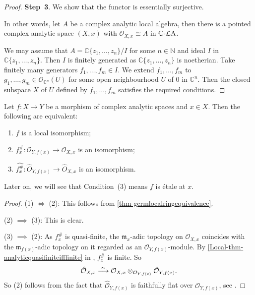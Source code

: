 \begin{proof}
    \textbf{Step~3}. We show that the functor is essentially surjective.

    In other words, let $A$ be a complex analytic local algebra, then there is a pointed complex analytic space $(X,x)$ with $\mathcal{O}_{X,x}\cong A$ in $\mathbb{C}\text{-}\mathcal{L}\mathrm{A}$.

    We may assume that $A=\mathbb{C}\{z_1,\ldots,z_n\}/I$ for some $n\in \mathbb{N}$ and ideal $I$ in $\mathbb{C}\{z_1,\ldots,z_n\}$. Then $I$ is finitely generated as $\mathbb{C}\{z_1,\ldots,z_n\}$ is noetherian. Take finitely many generators $f_1,\ldots,f_m\in I$. We extend $f_1,\ldots,f_m$ to $g_1,\ldots,g_m\in \mathcal{O}_{\mathbb{C}^n}(U)$ for some open neighbourhood $U$ of $0$ in $\mathbb{C}^n$. Then the closed subspace $X$ of $U$ defined by $f_1,\ldots,f_m$ satisfies the required conditions.
\end{proof}

\begin{corollary}\label{cor-localisocondition}
    Let $f:X\rightarrow Y$ be a morphism of complex analytic spaces and $x\in X$. Then the following are equivalent:
    \begin{enumerate}
        \item $f$ is a local isomorphism;
        \item $f^{\#}_x:\mathcal{O}_{Y,f(x)}\rightarrow \mathcal{O}_{X,x}$ is an isomorphism;
        \item $\widehat{f^{\#}_x}:\hat{O}_{Y,f(x)}\rightarrow \hat{O}_{X,x}$ is an isomorphism.
    \end{enumerate}
\end{corollary}
Later on, we will see that Condition~(3) means $f$ is étale at $x$.
\begin{proof}
    (1) $\Leftrightarrow$  (2): This follows from \cref{thm-germlocalringequivalence}.

    (2) $\implies$ (3): This is clear.

    (3) $\implies$ (2): As $f^{\#}_x$ is quasi-finite, the $\mathfrak{m}_x$-adic topology on $\mathcal{O}_{X,x}$ coincides with the $\mathfrak{m}_{f(x)}$-adic topology on it regarded as an $\mathcal{O}_{Y,f(x)}$-module.
    By \cref{Local-thm-analyticquasifiniteifffinite} in 
    , $f^{\#}_x$ is finite. 
    So
    \[
        \hat{\mathcal{O}}_{X,x}\stackrel{\sim}{\longrightarrow} \mathcal{O}_{X,x}\otimes_{\mathcal{O}_{Y,f(x)}}\hat{\mathcal{O}}_{Y,f(x)}.
    \]
    So (2) follows from the fact that $\hat{\mathcal{O}}_{Y,f(x)}$ is faithfully flat over $\mathcal{O}_{Y,f(x)}$, see \cite[\href{https://stacks.math.columbia.edu/tag/00MC}{Tag 00MC}]{stacks-project}.
\end{proof}

